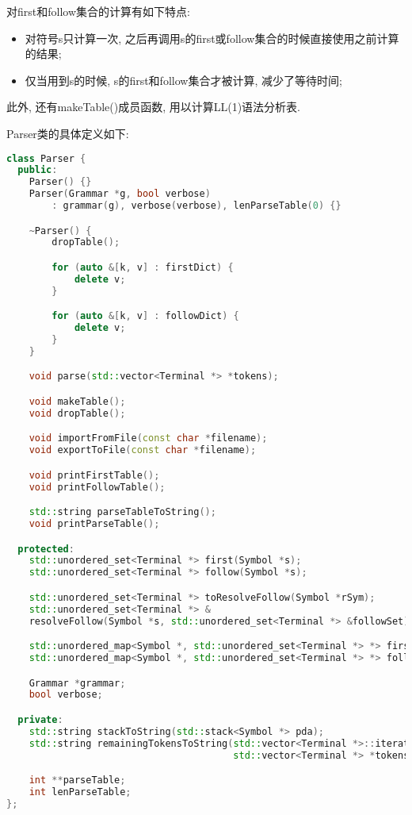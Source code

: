 对first和follow集合的计算有如下特点:
\begin{itemize}
	\item 对符号s只计算一次,
	      之后再调用s的first或follow集合的时候直接使用之前计算的结果;
	\item 仅当用到s的时候, s的first和follow集合才被计算, 减少了等待时间;
\end{itemize}
此外, 还有makeTable()成员函数, 用以计算LL(1)语法分析表.\par

Parser类的具体定义如下:
\begin{lstlisting}[language=c++]
class Parser {
  public:
    Parser() {}
    Parser(Grammar *g, bool verbose)
        : grammar(g), verbose(verbose), lenParseTable(0) {}

    ~Parser() {
        dropTable();

        for (auto &[k, v] : firstDict) {
            delete v;
        }

        for (auto &[k, v] : followDict) {
            delete v;
        }
    }

    void parse(std::vector<Terminal *> *tokens);

    void makeTable();
    void dropTable();

    void importFromFile(const char *filename);
    void exportToFile(const char *filename);

    void printFirstTable();
    void printFollowTable();

    std::string parseTableToString();
    void printParseTable();

  protected:
    std::unordered_set<Terminal *> first(Symbol *s);
    std::unordered_set<Terminal *> follow(Symbol *s);

    std::unordered_set<Terminal *> toResolveFollow(Symbol *rSym);
    std::unordered_set<Terminal *> &
    resolveFollow(Symbol *s, std::unordered_set<Terminal *> &followSet);

    std::unordered_map<Symbol *, std::unordered_set<Terminal *> *> firstDict;
    std::unordered_map<Symbol *, std::unordered_set<Terminal *> *> followDict;

    Grammar *grammar;
    bool verbose;

  private:
    std::string stackToString(std::stack<Symbol *> pda);
    std::string remainingTokensToString(std::vector<Terminal *>::iterator it,
                                        std::vector<Terminal *> *tokens);

    int **parseTable;
    int lenParseTable;
};
\end{lstlisting}

